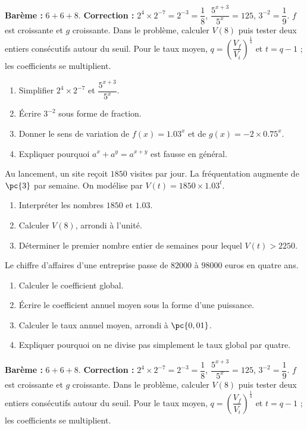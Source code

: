 \begin{solution}\textbf{Barème :} $6+6+8$. \textbf{Correction :} $2^4\times2^{-7}=2^{-3}=\dfrac18$, $\dfrac{5^{x+3}}{5^x}=125$, $3^{-2}=\dfrac19$. $f$ est croissante et $g$ croissante. Dans le problème, calculer $V(8)$ puis tester deux entiers consécutifs autour du seuil. Pour le taux moyen, $q=\left(\dfrac{V_f}{V_i}\right)^{\frac14}$ et $t=q-1$ ; les coefficients se multiplient.\end{solution}

\begin{exercise}
\begin{enumerate}
\item Simplifier $2^4\times2^{-7}$ et $\dfrac{5^{x+3}}{5^x}$.
\item Écrire $3^{-2}$ sous forme de fraction.
\item Donner le sens de variation de $f(x)=\num{1,03}^x$ et de $g(x)=-2\times\num{0,75}^x$.
\item Expliquer pourquoi $a^x+a^y=a^{x+y}$ est fausse en général.
\end{enumerate}
\end{exercise}
\begin{exercise}
Au lancement, un site reçoit $1850$ visites par jour. La fréquentation augmente de $\pc{3}$ par semaine. On modélise par $V(t)=1850\times\num{1,03}^t$.
\begin{enumerate}
\item Interpréter les nombres $1850$ et $\num{1,03}$.
\item Calculer $V(8)$, arrondi à l'unité.
\item Déterminer le premier nombre entier de semaines pour lequel $V(t)>2250$.
\end{enumerate}
\end{exercise}
\begin{exercise}
Le chiffre d'affaires d'une entreprise passe de $\num{82000}$ à $98000$ euros en quatre ans.
\begin{enumerate}
\item Calculer le coefficient global.
\item Écrire le coefficient annuel moyen sous la forme d'une puissance.
\item Calculer le taux annuel moyen, arrondi à $\pc{0,01}$.
\item Expliquer pourquoi on ne divise pas simplement le taux global par quatre.
\end{enumerate}
\end{exercise}
\begin{solution}\textbf{Barème :} $6+6+8$. \textbf{Correction :} $2^4\times2^{-7}=2^{-3}=\dfrac18$, $\dfrac{5^{x+3}}{5^x}=125$, $3^{-2}=\dfrac19$. $f$ est croissante et $g$ croissante. Dans le problème, calculer $V(8)$ puis tester deux entiers consécutifs autour du seuil. Pour le taux moyen, $q=\left(\dfrac{V_f}{V_i}\right)^{\frac14}$ et $t=q-1$ ; les coefficients se multiplient.\end{solution}

